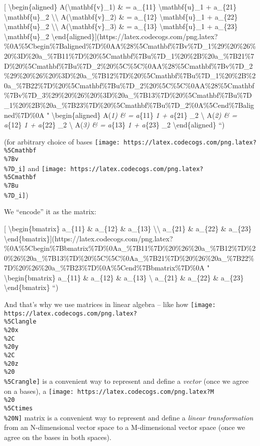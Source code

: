 \documentclass[]{article}
\begin{document}
{[} \textbackslash{}begin\{aligned\} A(\textbackslash{}mathbf\{v\}\_1) \& =
a\_\{11\} \textbackslash{}mathbf\{u\}\_1 + a\_\{21\}
\textbackslash{}mathbf\{u\}\_2 \textbackslash{}\textbackslash{}
A(\textbackslash{}mathbf\{v\}\_2) \& = a\_\{12\} \textbackslash{}mathbf\{u\}\_1
+ a\_\{22\} \textbackslash{}mathbf\{u\}\_2 \textbackslash{}\textbackslash{}
A(\textbackslash{}mathbf\{v\}\_3) \& = a\_\{13\} \textbackslash{}mathbf\{u\}\_1
+ a\_\{23\} \textbackslash{}mathbf\{u\}\_2
\textbackslash{}end\{aligned\}{]}(https://latex.codecogs.com/png.latex?\%0A\%5Cbegin\%7Baligned\%7D\%0AA\%28\%5Cmathbf\%7Bv\%7D\_1\%29\%20\%26\%20\%3D\%20a\_\%7B11\%7D\%20\%5Cmathbf\%7Bu\%7D\_1\%20\%2B\%20a\_\%7B21\%7D\%20\%5Cmathbf\%7Bu\%7D\_2\%20\%5C\%5C\%0AA\%28\%5Cmathbf\%7Bv\%7D\_2\%29\%20\%26\%20\%3D\%20a\_\%7B12\%7D\%20\%5Cmathbf\%7Bu\%7D\_1\%20\%2B\%20a\_\%7B22\%7D\%20\%5Cmathbf\%7Bu\%7D\_2\%20\%5C\%5C\%0AA\%28\%5Cmathbf\%7Bv\%7D\_3\%29\%20\%26\%20\%3D\%20a\_\%7B13\%7D\%20\%5Cmathbf\%7Bu\%7D\_1\%20\%2B\%20a\_\%7B23\%7D\%20\%5Cmathbf\%7Bu\%7D\_2\%0A\%5Cend\%7Baligned\%7D\%0A
" \textbackslash{}begin\{aligned\} A(\emph{1) \& = a}\{11\}
\emph{1 + a}\{21\} \_2 \textbackslash{} A(\emph{2)
\& = a}\{12\} \emph{1 + a}\{22\} \_2 \textbackslash{}
A(\emph{3) \& = a}\{13\} \emph{1 + a}\{23\} \_2
\textbackslash{}end\{aligned\} ``)

(for arbitrary choice of bases
\texttt{[image: https://latex.codecogs.com/png.latex?\\\%5Cmathbf\\\%7Bv\\\%7D\_i]} and
\texttt{[image: https://latex.codecogs.com/png.latex?\\\%5Cmathbf\\\%7Bu\\\%7D\_i]})

We ``encode'' it as the matrix:

{[} \textbackslash{}begin\{bmatrix\} a\_\{11\} \& a\_\{12\} \& a\_\{13\}
\textbackslash{}\textbackslash{} a\_\{21\} \& a\_\{22\} \& a\_\{23\}
\textbackslash{}end\{bmatrix\}{]}(https://latex.codecogs.com/png.latex?\%0A\%5Cbegin\%7Bbmatrix\%7D\%0Aa\_\%7B11\%7D\%20\%26\%20a\_\%7B12\%7D\%20\%26\%20a\_\%7B13\%7D\%20\%5C\%5C\%0Aa\_\%7B21\%7D\%20\%26\%20a\_\%7B22\%7D\%20\%26\%20a\_\%7B23\%7D\%0A\%5Cend\%7Bbmatrix\%7D\%0A
" \textbackslash{}begin\{bmatrix\} a\_\{11\} \& a\_\{12\} \& a\_\{13\}
\textbackslash{} a\_\{21\} \& a\_\{22\} \& a\_\{23\}
\textbackslash{}end\{bmatrix\} ``)

And that's why we use matrices in linear algebra -- like how
\texttt{[image: https://latex.codecogs.com/png.latex?\\\%5Clangle\\\%20x\\\%2C\\\%20y\\\%2C\\\%20z\\\%20\\\%5Crangle]}
is a convenient way to represent and define a \emph{vector} (once we agree on a
bases), a
\texttt{[image: https://latex.codecogs.com/png.latex?M\\\%20\\\%5Ctimes\\\%20N]}
matrix is a convenient way to represent and define a \emph{linear
transformation} from an N-dimensional vector space to a M-dimensional vector
space (once we agree on the bases in both spaces).
\end{document}
